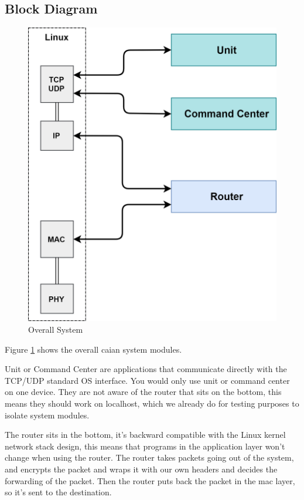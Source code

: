 \subsection{Block Diagram}
\begin{figure}[!htb]
    \centering
    \includegraphics[width=0.8\linewidth]{images/overall-system.png}
    \caption{Overall System}
    \label{fig:overall-system}
\end{figure}

Figure \ref{fig:overall-system} shows the overall \acrshort{caian} system modules.

Unit or Command Center are applications that communicate directly with the TCP/UDP standard OS interface.
You would only use unit or command center on one device.
They are not aware of the router that sits on the bottom, this means they should work on localhost, which we already do for testing purposes to isolate system modules.

The router sits in the bottom, it's backward compatible with the Linux kernel network stack design, this means that programs in the application layer won't change when using the router.
The router takes packets going out of the system, and encrypts the packet and wraps it with our own headers and decides the forwarding of the packet.
Then the router puts back the packet in the \acrshort{mac} layer, so it's sent to the destination.

